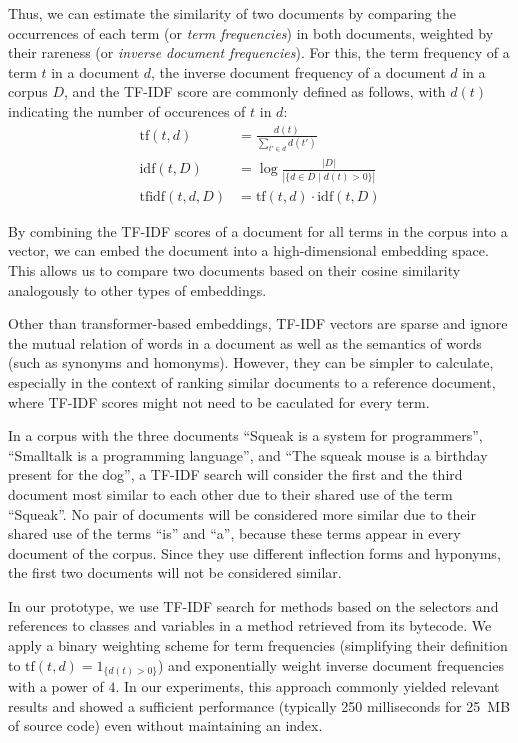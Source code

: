Thus, we can estimate the similarity of two documents by comparing the occurrences of each term (or \emph{term frequencies}) in both documents, weighted by their rareness (or \emph{inverse document frequencies}).
For this, the term frequency of a term $t$ in a document $d$, the inverse document frequency of a document $d$ in a corpus $D$, and the TF-IDF score are commonly defined as follows, with $d(t)$ indicating the number of occurences of $t$ in $d$:
\begin{align}
	\text{tf}(t, d)	&= \frac{d(t)}{\sum_{t' \in d} d(t')} \\
	\text{idf}(t, D)	&= \log \frac{|D|}{|\{d \in D \mid d(t) > 0\}|} \\
	\text{tfidf}(t, d, D)	&= \text{tf}(t, d) \cdot \text{idf}(t, D)
\end{align}

By combining the TF-IDF scores of a document for all terms in the corpus into a vector, we can embed the document into a high-dimensional embedding space.
This allows us to compare two documents based on their cosine similarity analogously to other types of embeddings.

Other than transformer-based embeddings, TF-IDF vectors are sparse and ignore the mutual relation of words in a document as well as the semantics of words (such as synonyms and homonyms).
However, they can be simpler to calculate, especially in the context of ranking similar documents to a reference document, where TF-IDF scores might not need to be caculated for every term.

\begin{example}
	In a corpus with the three documents ``Squeak is a system for programmers'', ``Smalltalk is a programming language'', and ``The squeak mouse is a birthday present for the dog'', a TF-IDF search will consider the first and the third document most similar to each other due to their shared use of the term ``Squeak''.
	No pair of documents will be considered more similar due to their shared use of the terms ``is'' and ``a'', because these terms appear in every document of the corpus.
	Since they use different inflection forms and hyponyms, the first two documents will not be considered similar.
\end{example}

In our prototype, we use TF-IDF search for methods based on the selectors and references to classes and variables in a method retrieved from its bytecode.
We apply a binary weighting scheme for term frequencies (simplifying their definition to $\text{tf}(t, d) = 1_{\{d(t) > 0\}}$) and exponentially weight inverse document frequencies with a power of $4$.
In our experiments, this approach commonly yielded relevant results and showed a sufficient performance (typically 250 milliseconds for \qty{25}{MB} of source code) even without maintaining an index.

